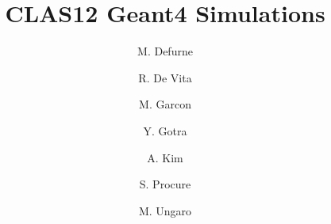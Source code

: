 \title{CLAS12 Geant4 Simulations}



\author[C]{M. Defurne}
\author[B]{R. De Vita}
\author[C]{M. Garcon}
\author[A]{Y. Gotra}
\author[D]{A. Kim}
\author[C]{S. Procure}
\author[A]{M. Ungaro}

\address[A]{Thomas Jefferson National Accelerator Facility, Newport News, VA, USA}
\address[B]{Istituto Nazionale Di Fisica Nucleare, Genova, Italy}
\address[C]{IRFU, CEA, Universit\`e Paris-Saclay, F-91191 Gif-sur-Yvette, France}
\address[D]{University of Connecticut, Storrs, Connecticut}
